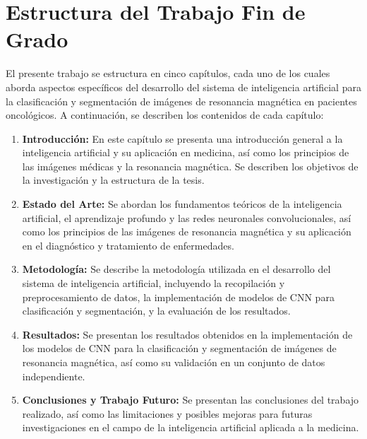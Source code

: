 \section{Estructura del Trabajo Fin de Grado} \label{sec:estructura}
El presente trabajo se estructura en cinco capítulos, cada uno de los cuales aborda aspectos específicos del desarrollo del sistema de inteligencia artificial para la clasificación y segmentación de imágenes de resonancia magnética en pacientes oncológicos. A continuación, se describen los contenidos de cada capítulo: 
\begin{enumerate}
    \item \textbf{Introducción:} En este capítulo se presenta una introducción general a la inteligencia artificial y su aplicación en medicina, así como los principios de las imágenes médicas y la resonancia magnética. Se describen los objetivos de la investigación y la estructura de la tesis.
    \item \textbf{Estado del Arte:} Se abordan los fundamentos teóricos de la inteligencia artificial, el aprendizaje profundo y las redes neuronales convolucionales, así como los principios de las imágenes de resonancia magnética y su aplicación en el diagnóstico y tratamiento de enfermedades.
    \item \textbf{Metodología:} Se describe la metodología utilizada en el desarrollo del sistema de inteligencia artificial, incluyendo la recopilación y preprocesamiento de datos, la implementación de modelos de CNN para clasificación y segmentación, y la evaluación de los resultados.
    \item \textbf{Resultados:} Se presentan los resultados obtenidos en la implementación de los modelos de CNN para la clasificación y segmentación de imágenes de resonancia magnética, así como su validación en un conjunto de datos independiente.
    \item \textbf{Conclusiones y Trabajo Futuro:} Se presentan las conclusiones del trabajo realizado, así como las limitaciones y posibles mejoras para futuras investigaciones en el campo de la inteligencia artificial aplicada a la medicina.
\end{enumerate}    